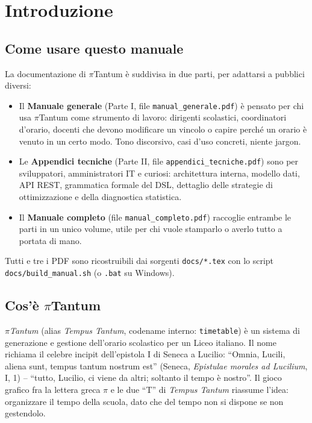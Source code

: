 \chapter{Introduzione}

\section*{Come usare questo manuale}

La documentazione di $\pi$Tantum \`e suddivisa in due parti, per
adattarsi a pubblici diversi:

\begin{itemize}
\item Il \textbf{Manuale generale} (Parte I, file
  \texttt{manual\_generale.pdf}) \`e pensato per chi usa
  $\pi$Tantum come strumento di lavoro: dirigenti scolastici,
  coordinatori d'orario, docenti che devono modificare un
  vincolo o capire perch\'e un orario \`e venuto in un certo
  modo. Tono discorsivo, casi d'uso concreti, niente jargon.
\item Le \textbf{Appendici tecniche} (Parte II, file
  \texttt{appendici\_tecniche.pdf}) sono per sviluppatori,
  amministratori IT e curiosi: architettura interna, modello
  dati, API REST, grammatica formale del DSL, dettaglio delle
  strategie di ottimizzazione e della diagnostica statistica.
\item Il \textbf{Manuale completo} (file
  \texttt{manual\_completo.pdf}) raccoglie entrambe le parti
  in un unico volume, utile per chi vuole stamparlo o averlo
  tutto a portata di mano.
\end{itemize}

Tutti e tre i PDF sono ricostruibili dai sorgenti
\texttt{docs/*.tex} con lo script \texttt{docs/build\_manual.sh}
(o \texttt{.bat} su Windows).

\section*{Cos'\`e $\pi$Tantum}

\emph{$\pi$Tantum} (alias \emph{Tempus Tantum}, codename interno:
\texttt{timetable}) \`e un sistema di generazione e gestione
dell'orario scolastico per un Liceo italiano. Il nome richiama il
celebre incipit dell'epistola I di Seneca a Lucilio:
``Omnia, Lucili, aliena sunt, tempus tantum nostrum est'' (Seneca,
\emph{Epistulae morales ad Lucilium}, I, 1) -- ``tutto, Lucilio, ci
viene da altri; soltanto il tempo \`e nostro''. Il gioco grafico fra la
lettera greca $\pi$ e le due ``T'' di \emph{Tempus Tantum} riassume
l'idea: organizzare il tempo della scuola, dato che del tempo non
si dispone se non gestendolo.


